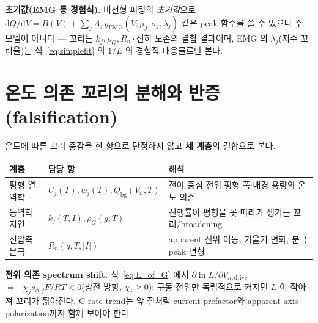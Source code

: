 \documentclass[11pt,a4paper]{article}
\newcommand{\dd}{\mathrm{d}}
\newcommand{\drive}{\mathrm{drive}}
\newcommand{\bg}{\mathrm{bg}}
\begin{document}
\textbf{초기값(EMG 등 경험식).} 비선형 피팅의 \emph{초기값}으로 $\dd Q/\dd V=B(V)+\sum_j A_j\,g_\mathrm{EMG}
(V;\mu_j,\sigma_j,\lambda_j)$ 같은 peak 함수를 쓸 수 있으나 주 모델이 아니다 — 꼬리는 $k_j,\rho_G,R_n\cdot$전하
보존의 결합 결과이며, EMG 의 $\lambda_j$(지수 꼬리율)는 식~\eqref{eq:simplefit} 의 $1/L$ 의 경험적 대응물로만 본다.

\section{온도 의존 꼬리의 분해와 반증(falsification)}\label{sec:falsify}
온도에 따른 꼬리 증감을 한 항으로 단정하지 않고 \textbf{세 계층}의 결합으로 본다.
\begin{longtable}{p{} p{} p{}}
\toprule 계층 & 담당 항 & 해석 \\ \midrule \endhead
평형 열역학 & $U_j(T),w_j(T),Q_\bg(V_n,T)$ & 전이 중심 전위$\cdot$평형 폭$\cdot$배경 용량의 온도 의존 \\
동역학 지연 & $k_j(T,I),\rho_G(g;T)$ & 진행률이 평형을 못 따라가 생기는 꼬리/broadening \\
전압축 분극 & $R_n(q,T,|I|)$ & apparent 전위 이동, 기울기 변화, 분극 peak 변형 \\
\bottomrule
\end{longtable}
\textbf{전위 의존 spectrum shift.} 식~\eqref{eq:L_of_G} 에서 $\partial\ln L/\partial V_{n,\drive}$
$=-\chi_j s_{\phi,j}F/RT<0$(방전 방향, $\chi_j\ge0$): 구동 전위만 독립적으로 커지면 $L$ 이 작아져 꼬리가 짧아진다.
C-rate trend는 앞 절처럼 current prefactor와 apparent-axis polarization까지 함께 보아야 한다.
\end{document}
